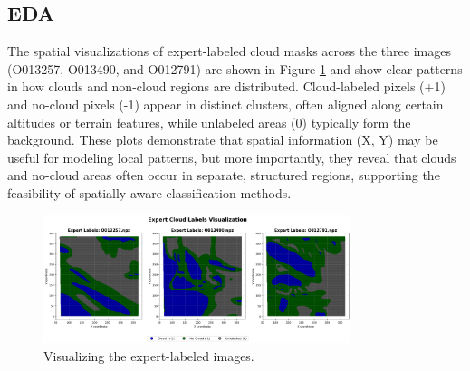 \documentclass[11pt,letterpaper]{article}
\begin{document}
\subsection{EDA}
\vspace{0.5em} %




The spatial visualizations of expert-labeled cloud masks across the three images (O013257, O013490, and O012791) are shown in Figure \ref{fig:eda1} and show clear patterns in how clouds and non-cloud regions are distributed. Cloud-labeled pixels (+1) and no-cloud pixels (-1) appear in distinct clusters, often aligned along certain altitudes or terrain features, while unlabeled areas (0) typically form the background. These plots demonstrate that spatial information (X, Y) may be useful for modeling local patterns, but more importantly, they reveal that clouds and no-cloud areas often occur in separate, structured regions, supporting the feasibility of spatially aware classification methods.
\begin{figure}[H]
    \centering
    \includegraphics[width=0.8\textwidth]{figs/eda1.png}
    \caption{Visualizing the expert-labeled images.}
    \label{fig:eda1}
\end{figure}\noindent
\end{document}

